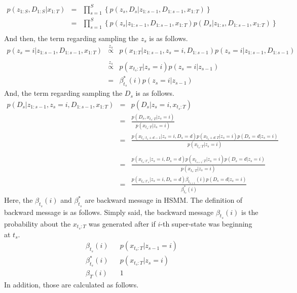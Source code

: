 \documentclass[a4paper]{article}
\newcommand{\proptoas}[1]{\overset{#1}{\propto}}
\DeclareMathOperator{\defeq}{\ensuremath{\stackrel{\mathrm{def}}{=}}}
\begin{document}
	\begin{eqnarray}
		p(z_{1:S}, D_{1:S} | x_{1:T})
		&=&
		\prod_{s=1}^{S}{\left\{ p(z_s, D_s  |  z_{1:s-1}, D_{1:s-1}, x_{1:T}) \right\}}\\
		&=&
		\prod_{s=1}^{S}{\left\{ p(z_s |  z_{1:s-1}, D_{1:s-1}, x_{1:T}) p(D_s | z_{1:s}, D_{1:s-1}, x_{1:T})\right\}} \nonumber \\
	\end{eqnarray}
	And then, the term regarding sampling the $z_s$ is as follows.
	\begin{eqnarray}
		p(z_s = i |  z_{1:s-1}, D_{1:s-1}, x_{1:T})
		&\proptoas{z_s}&
		p(x_{1:T} | z_{1:s-1}, z_s = i, D_{1:s-1}) p(z_s = i | z_{1:s-1}, D_{1:s-1}) \nonumber \\ \\
		&\proptoas{z_s}&
		p(x_{t_s:T} | z_s = i) p(z_s = i | z_{s-1}) \\
		&=&
		\beta_{t_s}^{*}(i) p(z_s = i | z_{s-1})
	\end{eqnarray}
	And, the term regarding sampling the $D_s$ is as follows.
	\begin{eqnarray}
		p(D_s | z_{1:s-1}, z_s = i, D_{1:s-1}, x_{1:T})
		&=&
		p(D_s | z_s = i, x_{t_s:T}) \\
		&=&
		\frac{p(D_s, x_{t_s:T} | z_s = i)}{p(x_{t_s:T} | z_s = i)}\\
		&=&
		\frac{p(x_{t_s:t_s+d-1} | z_s = i, D_s = d) p(x_{t_s+d:T} | z_s = i) p(D_s = d| z_s = i)}{p(x_{t_s:T} | z_s = i)} \nonumber \\
		\\
		&=&
		\frac{p(x_{t_s:t'_s} | z_s = i, D_s = d) p(x_{t_{s+1}:T} | z_s = i) p(D_s = d| z_s = i)}{p(x_{t_s:T} | z_s = i)} \\
		&=&
		\frac{p(x_{t_s:t'_s} | z_s = i, D_s = d) \beta_{t_{s+1}}(i) p(D_s = d| z_s = i)}{\beta_{t_s}^{*}(i)}
	\end{eqnarray}
	Here, the $\beta_{t_s}(i)$ and $\beta_{t_s}^{*}$ are backward message in HSMM.
	The definition of backward message is as follows.
	Simply said, the backward message $\beta_{t_s}(i)$ is the probability about the $x_{t_s:T}$ was generated after if $i$-th super-state was beginning at $t_s$.
	\begin{eqnarray}
		\beta_{t_s}(i)
		&\defeq&
		p(x_{t_s:T} | z_{s-1} = i) \\
		\beta_{t_s}^{*}(i)
		&\defeq&
		p(x_{t_s:T} | z_s = i) \\
		\beta_{T}(i)
		&\defeq&
		1
	\end{eqnarray}
	In addition, those are calculated as follows.
\end{document}
